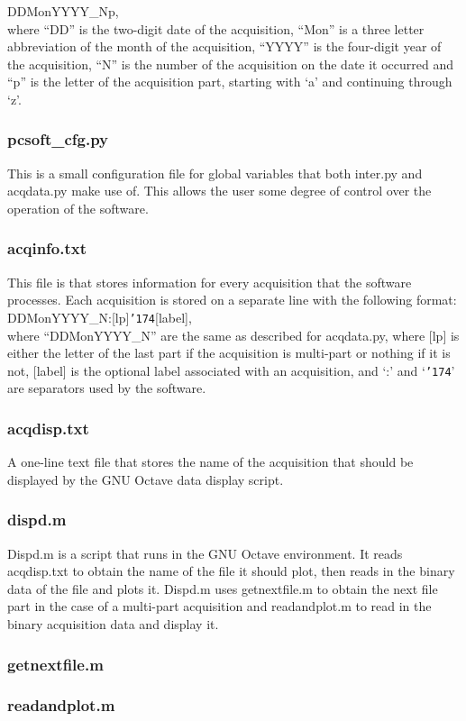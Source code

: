 DDMonYYYY\_Np, \\

where ``DD'' is the two-digit date of the acquisition, ``Mon'' is a three letter abbreviation 
of the month of the acquisition, ``YYYY'' is the four-digit year of the acquisition, ``N'' is 
the number of the acquisition on the date it occurred and ``p'' is the letter of the acquisition part, starting with `a' and continuing through `z'. 


\subsubsection[pcsoft\_cfg.py]{pcsoft\_cfg.py}
This is a small configuration file for global variables that both inter.py and acqdata.py make
use of. This allows the user some degree of control over the operation of the software.


\subsubsection[acqinfo.txt]{acqinfo.txt}
This file is that stores information for every acquisition that the software processes. Each
acquisition is stored on a separate line with the following format: \\

DDMonYYYY\_N:[lp]{\tt\char'174}[label], \\

where ``DDMonYYYY\_N'' are the same as described for acqdata.py, where [lp] is either
the letter of the last part if the acquisition is multi-part or nothing if it is not, [label]
is the optional label associated with an acquisition, and `:' and `{\tt\char'174}' are separators used by
the software.


\subsubsection[acqdisp.txt]{acqdisp.txt}
A one-line text file that stores the name of the acquisition that should be displayed by
the GNU Octave data display script.


\subsubsection[dispd.m]{dispd.m}
Dispd.m is a script that runs in the GNU Octave environment. It reads acqdisp.txt to obtain
the name of the file it should plot, then reads in the binary data of the file and plots it.
Dispd.m uses getnextfile.m to obtain the next file part in the case of a multi-part
acquisition and readandplot.m to read in the binary acquisition data and display it.


\subsubsection[getnextfile.m]{getnextfile.m}


\subsubsection[readandplot.m]{readandplot.m}
